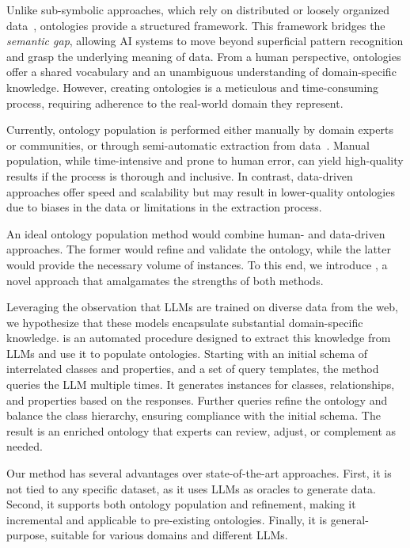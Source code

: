 Unlike sub-symbolic approaches, which rely on distributed or loosely organized data~\cite{DBLP:journals/csur/CiattoSAMO24}, ontologies provide a structured framework.
%
This framework bridges the \emph{semantic gap}, allowing \gls{AI} systems to move beyond superficial pattern recognition and grasp the underlying meaning of data.
%
From a human perspective, ontologies offer a shared vocabulary and an unambiguous understanding of domain-specific knowledge.
%
However, creating ontologies is a meticulous and time-consuming process, requiring adherence to the real-world domain they represent.


Currently, ontology population is performed either manually by domain experts or communities, or through semi-automatic extraction from data~\cite{petasis-2011}.
%
Manual population, while time-intensive and prone to human error, can yield high-quality results if the process is thorough and inclusive.
%
In contrast, data-driven approaches offer speed and scalability but may result in lower-quality ontologies due to biases in the data or limitations in the extraction process.


An ideal ontology population method would combine human- and data-driven approaches.
%
The former would refine and validate the ontology, while the latter would provide the necessary volume of instances.
%
To this end, we introduce \llmfkg, a novel approach that amalgamates the strengths of both methods.


Leveraging the observation that \glspl{LLM} are trained on diverse data from the web, we hypothesize that these models encapsulate substantial domain-specific knowledge.
%
\llmfkg{} is an automated procedure designed to extract this knowledge from \glspl{LLM} and use it to populate ontologies.
%
Starting with an initial schema of interrelated classes and properties, and a set of query templates, the method queries the \gls{LLM} multiple times.
%
It generates instances for classes, relationships, and properties based on the responses.
%
Further queries refine the ontology and balance the class hierarchy, ensuring compliance with the initial schema.
%
The result is an enriched ontology that experts can review, adjust, or complement as needed.


Our method has several advantages over state-of-the-art approaches.
%
First, it is not tied to any specific dataset, as it uses \glspl{LLM} as oracles to generate data.
%
Second, it supports both ontology population and refinement, making it incremental and applicable to pre-existing ontologies.
%
Finally, it is general-purpose, suitable for various domains and different \glspl{LLM}.


